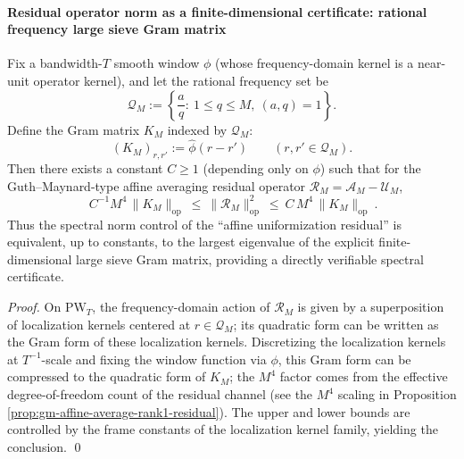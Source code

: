 \paragraph{Residual operator norm as a finite-dimensional certificate: rational frequency large sieve Gram matrix}
\begin{theorem}\label{thm:gm-residual-opnorm-gram-equivalence}
Fix a bandwidth-\(T\) smooth window \(\phi\) (whose frequency-domain kernel is a near-unit operator kernel), and let the rational frequency set be
\[
\mathcal{Q}_M:=\left\{\frac{a}{q}:\ 1\le q\le M,\ (a,q)=1\right\}.
\]
Define the Gram matrix \(K_M\) indexed by \(\mathcal{Q}_M\):
\[
(K_M)_{r,r'}:=\widehat{\phi}(r-r')\qquad (r,r'\in\mathcal{Q}_M).
\]
Then there exists a constant \(C\ge 1\) (depending only on \(\phi\)) such that for the Guth--Maynard-type affine averaging residual operator \(\mathcal{R}_M=\mathcal{A}_M-\mathcal{U}_M\),
\[
\boxed{\
C^{-1}M^4\,\|K_M\|_{\mathrm{op}}
\ \le\
\|\mathcal{R}_M\|_{\mathrm{op}}^2
\ \le\
C\,M^4\,\|K_M\|_{\mathrm{op}}
\ }.
\]
Thus the spectral norm control of the ``affine uniformization residual'' is equivalent, up to constants, to the largest eigenvalue of the explicit finite-dimensional large sieve Gram matrix, providing a directly verifiable spectral certificate.
\end{theorem}

\begin{proof}
On \(\mathrm{PW}_T\), the frequency-domain action of \(\mathcal{R}_M\) is given by a superposition of localization kernels centered at \(r\in\mathcal{Q}_M\); its quadratic form can be written as the Gram form of these localization kernels.
Discretizing the localization kernels at \(T^{-1}\)-scale and fixing the window function via \(\phi\), this Gram form can be compressed to the quadratic form of \(K_M\); the \(M^4\) factor comes from the effective degree-of-freedom count of the residual channel (see the \(M^4\) scaling in Proposition \ref{prop:gm-affine-average-rank1-residual}).
The upper and lower bounds are controlled by the frame constants of the localization kernel family, yielding the conclusion. \qed
\end{proof}

